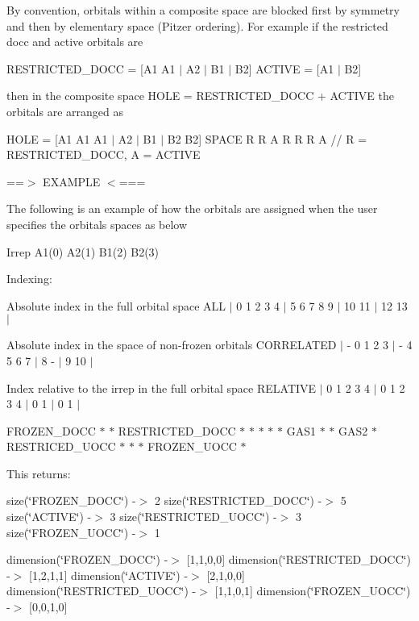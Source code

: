 By convention, orbitals within a composite space are blocked first by symmetry and then by elementary space (Pitzer ordering). For example if the restricted docc and active orbitals are

R\+E\+S\+T\+R\+I\+C\+T\+E\+D\+\_\+\+D\+O\+CC = \mbox{[}A1 A1 $\vert$ A2 $\vert$ B1 $\vert$ B2\mbox{]} A\+C\+T\+I\+VE = \mbox{[}A1 $\vert$ B2\mbox{]}

then in the composite space H\+O\+LE = R\+E\+S\+T\+R\+I\+C\+T\+E\+D\+\_\+\+D\+O\+CC + A\+C\+T\+I\+VE the orbitals are arranged as

H\+O\+LE = \mbox{[}A1 A1 A1 $\vert$ A2 $\vert$ B1 $\vert$ B2 B2\mbox{]} S\+P\+A\+CE R R A R R R A // R = R\+E\+S\+T\+R\+I\+C\+T\+E\+D\+\_\+\+D\+O\+CC, A = A\+C\+T\+I\+VE

==$>$ E\+X\+A\+M\+P\+LE $<$===

The following is an example of how the orbitals are assigned when the user specifies the orbitals spaces as below

Irrep A1(0) A2(1) B1(2) B2(3)

Indexing\+:

Absolute index in the full orbital space A\+LL $\vert$ 0 1 2 3 4 $\vert$ 5 6 7 8 9 $\vert$ 10 11 $\vert$ 12 13 $\vert$

Absolute index in the space of non-\/frozen orbitals C\+O\+R\+R\+E\+L\+A\+T\+ED $\vert$ -\/ 0 1 2 3 $\vert$ -\/ 4 5 6 7 $\vert$ 8 -\/ $\vert$ 9 10 $\vert$

Index relative to the irrep in the full orbital space R\+E\+L\+A\+T\+I\+VE $\vert$ 0 1 2 3 4 $\vert$ 0 1 2 3 4 $\vert$ 0 1 $\vert$ 0 1 $\vert$

F\+R\+O\+Z\+E\+N\+\_\+\+D\+O\+CC $\ast$ $\ast$ R\+E\+S\+T\+R\+I\+C\+T\+E\+D\+\_\+\+D\+O\+CC $\ast$ $\ast$ $\ast$ $\ast$ $\ast$ G\+A\+S1 $\ast$ $\ast$ G\+A\+S2 $\ast$ R\+E\+S\+T\+R\+I\+C\+E\+D\+\_\+\+U\+O\+CC $\ast$ $\ast$ $\ast$ F\+R\+O\+Z\+E\+N\+\_\+\+U\+O\+CC $\ast$

This returns\+:

size(\char`\"{}\+F\+R\+O\+Z\+E\+N\+\_\+\+D\+O\+C\+C\char`\"{}) -\/$>$ 2 size(\char`\"{}\+R\+E\+S\+T\+R\+I\+C\+T\+E\+D\+\_\+\+D\+O\+C\+C\char`\"{}) -\/$>$ 5 size(\char`\"{}\+A\+C\+T\+I\+V\+E\char`\"{}) -\/$>$ 3 size(\char`\"{}\+R\+E\+S\+T\+R\+I\+C\+T\+E\+D\+\_\+\+U\+O\+C\+C\char`\"{}) -\/$>$ 3 size(\char`\"{}\+F\+R\+O\+Z\+E\+N\+\_\+\+U\+O\+C\+C\char`\"{}) -\/$>$ 1

dimension(\char`\"{}\+F\+R\+O\+Z\+E\+N\+\_\+\+D\+O\+C\+C\char`\"{}) -\/$>$ \mbox{[}1,1,0,0\mbox{]} dimension(\char`\"{}\+R\+E\+S\+T\+R\+I\+C\+T\+E\+D\+\_\+\+D\+O\+C\+C\char`\"{}) -\/$>$ \mbox{[}1,2,1,1\mbox{]} dimension(\char`\"{}\+A\+C\+T\+I\+V\+E\char`\"{}) -\/$>$ \mbox{[}2,1,0,0\mbox{]} dimension(\char`\"{}\+R\+E\+S\+T\+R\+I\+C\+T\+E\+D\+\_\+\+U\+O\+C\+C\char`\"{}) -\/$>$ \mbox{[}1,1,0,1\mbox{]} dimension(\char`\"{}\+F\+R\+O\+Z\+E\+N\+\_\+\+U\+O\+C\+C\char`\"{}) -\/$>$ \mbox{[}0,0,1,0\mbox{]}

